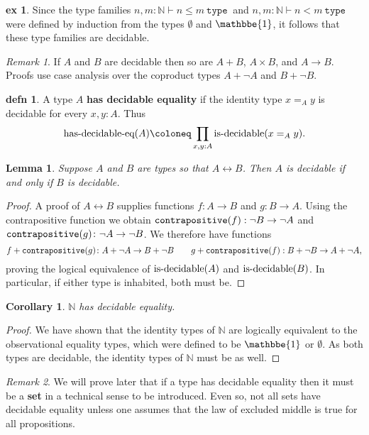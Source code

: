 \documentclass{amsart}
\theoremstyle{theorem}
\newtheorem*{lem}{Lemma}
\newtheorem*{cor}{Corollary}
\theoremstyle{definition}
\newtheorem*{defn}{defn}
\newtheorem*{ex}{ex}
\theoremstyle{remark}
\newtheorem*{rmk}{Remark}
\newcommand{\0}{\mathbbe{0}}
\newcommand{\1}{\mathbbe{1}}
\newcommand{\2}{\mathbbe{2}}
\newcommand{\3}{\mathbbe{3}}
\newcommand{\4}{\mathbbe{4}}
\newcommand{\univ}{{~\texttt{type}~}}
\newcommand{\term}[1]{{\textup{\texttt{#1}}}}
\newcommand{\type}[1]{{\textup{#1}}}
\newcommand{\bN}{{\mathbb{N}}}
\begin{document}
\begin{ex} Since the type families $n, m: \bN \vdash n \leq m \univ$ and $n, m : \bN \vdash n < m \univ$ were defined by induction from the types $\emptyset$ and $\1$, it follows that these type families are decidable.
\end{ex}

\begin{rmk}
If $A$ and $B$ are decidable then so are $A+B$, $A \times B$, and $A \to B$. Proofs use case analysis over the coproduct types $A + \neg A$ and $B + \neg B$. 
\end{rmk}

\begin{defn} A type $A$ \textbf{has decidable equality} if the identity type $x=_Ay$ is decidable for every $x, y : A$. Thus
\[ \type{has-decidable-eq}(A) \coloneq \prod_{x,y: A} \type{is-decidable}(x=_Ay).\]
\end{defn}

\begin{lem} Suppose $A$ and $B$ are types so that $A \leftrightarrow B$. Then $A$ is decidable if and only if $B$ is decidable.
\end{lem}
\begin{proof}
A proof of $A \leftrightarrow B$ supplies functions $f \colon A \to B$ and $g \colon B \to A$. Using the contrapositive function we obtain $\term{contrapositive}(f) : \neg B \to \neg A$ and $\term{contrapositive}(g) \colon \neg A \to \neg B$. We therefore have functions
\[ f + \term{contrapositive}(g) \colon A + \neg A \to B + \neg B \qquad g + \term{contrapositive}(f) : B + \neg B \to A + \neg A,\]
proving the logical equivalence of $\type{is-decidable}(A)$ and $\type{is-decidable}(B)$. In particular, if either type is inhabited, both must be. 
\end{proof}

\begin{cor} $\bN$ has decidable equality.
\end{cor}
\begin{proof}
We have shown that the identity types of $\bN$ are logically equivalent to the observational equality types, which were defined to be $\1$ or $\emptyset$. As both types are decidable, the identity types of $\bN$ must be as well.
\end{proof}

\begin{rmk} We will prove later that if a type has decidable equality then it must be a \textbf{set} in a technical sense to be introduced. Even so, not all sets have decidable equality unless one assumes that the law of excluded middle is true for all propositions.
\end{rmk}
\end{document}
